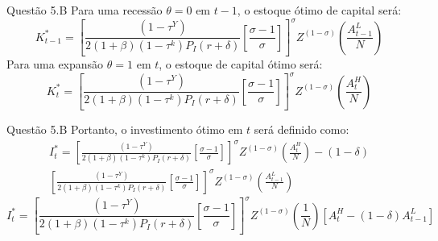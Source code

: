 \documentclass[aspectratio=169]{beamer}
\begin{document}
\begin{frame}{Questão 5.B}
    Para uma recessão $\theta=0$ em $t-1$, o estoque ótimo de capital será:
\begin{equation}
    K_{t-1}^* = \left[\frac{(1-\tau^Y)}{2(1+\beta)(1-\tau^k)P_I(r+\delta)}\left[\frac{\sigma-1}{\sigma}\right]\right]^{\sigma}Z^{(1-\sigma)}\left(\frac{A_{t-1}^L}{N}\right)
\end{equation}
Para uma expansão $\theta=1$ em $t$, o estoque de capital ótimo será:
\begin{equation}
    K_{t}^* = \left[\frac{(1-\tau^Y)}{2(1+\beta)(1-\tau^k)P_I(r+\delta)}\left[\frac{\sigma-1}{\sigma}\right]\right]^{\sigma}Z^{(1-\sigma)}\left(\frac{A_{t}^H}{N}\right)
\end{equation}
\end{frame}

\begin{frame}{Questão 5.B}
Portanto, o investimento ótimo em $t$ será definido como:
\begin{equation}
\begin{split}
    I_t^* = \left[\frac{(1-\tau^Y)}{2(1+\beta)(1-\tau^k)P_I(r+\delta)}\left[\frac{\sigma-1}{\sigma}\right]\right]^{\sigma}Z^{(1-\sigma)}\left(\frac{A_{t}^H}{N}\right) -(1-\delta)\\
    \left[\frac{(1-\tau^Y)}{2(1+\beta)(1-\tau^k)P_I(r+\delta)}\left[\frac{\sigma-1}{\sigma}\right]\right]^{\sigma}Z^{(1-\sigma)}\left(\frac{A_{t-1}^L}{N}\right)
\end{split}
\end{equation}
\begin{equation}
    I_t^*=\left[\frac{(1-\tau^Y)}{2(1+\beta)(1-\tau^k)P_I(r+\delta)}\left[\frac{\sigma-1}{\sigma}\right]\right]^{\sigma}Z^{(1-\sigma)}\left(\frac{1}{N}\right)\left[A_{t}^H-(1-\delta)A_{t-1}^L\right]
\end{equation}    
\end{frame}
\end{document}
